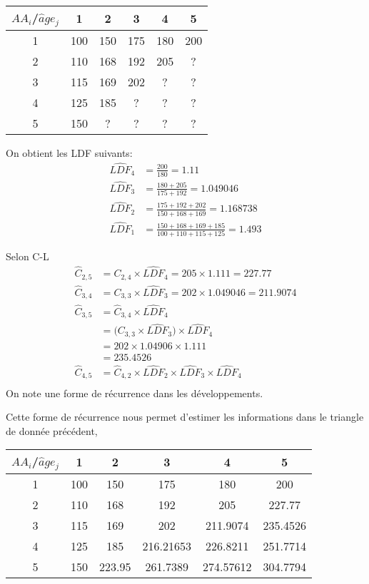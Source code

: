 \begin{center}
\begin{tabular}{|c|c|c|c|c|c|}
  \hline
   $AA_i$/$\widehat{a}ge_j$ & 1 & 2 & 3 & 4 & 5 \\
  \hline
  1 & 100 & 150 & 175 & 180 & 200 \\
  2 & 110 & 168 & 192 & 205 & ?\\
  3 & 115 & 169 & 202 & ? & ?\\ 
  4 & 125 & 185 & ? & ? & ? \\
  5 & 150 & ? & ? & ? & ?\\ 
  \hline
\end{tabular}
\end{center}
On obtient les LDF suivants:
\begin{align*}
\widehat{LDF}_4 &= \frac{200}{180} = 1.11 \\
\widehat{LDF}_3 &= \frac{180+205}{175+192} = 1.049046 \\
\widehat{LDF}_2 &= \frac{175+192+202}{150+168+169} = 1.168738 \\
\widehat{LDF}_1 &= \frac{150+168+169+185}{100+110+115+125} = 1.493
\end{align*}

Selon C-L
\begin{align*}
\widehat{C}_{2,5} &= C_{2,4} \times \widehat{LDF}_4 = 205 \times 1.111 = 227.77 \\
\widehat{C}_{3,4} &= C_{3,3} \times \widehat{LDF}_3 = 202 \times 1.049046 = 211.9074\\
\widehat{C}_{3,5} &= \widehat{C}_{3,4} \times \widehat{LDF}_4 \\
&= \Bigg( C_{3,3} \times \widehat{LDF}_3 \Bigg) \times \widehat{LDF}_4 \\
&= 202 \times 1.04906 \times 1.111 \\
&= 235.4526 \\
\widehat{C}_{4,5} &= \widehat{C}_{4,2} \times \widehat{LDF}_2 \times \widehat{LDF}_3 \times \widehat{LDF}_4 \\
\end{align*}
On note une forme de récurrence dans les développements. 

Cette forme de récurrence nous permet d'estimer les informations dans le triangle de donnée précédent,

\begin{center}
\begin{tabular}{|c|c|c|c|c|c|}
  \hline
   $AA_i$/$\widehat{a}ge_j$ & 1 & 2 & 3 & 4 & 5 \\
  \hline
  1 & 100 & 150 & 175 & 180 & 200 \\
  2 & 110 & 168 & 192 & 205 & 227.77\\
  3 & 115 & 169 & 202 & 211.9074 & 235.4526\\ 
  4 & 125 & 185 & 216.21653 & 226.8211 & 251.7714 \\
  5 & 150 & 223.95 & 261.7389 & 274.57612 & 304.7794\\ 
  \hline
\end{tabular}
\end{center}

